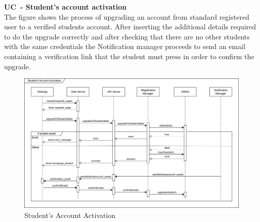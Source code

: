 \textbf{UC\cuc\  - Student’s account activation} \\
The figure shows the process of upgrading an account from standard registered user to a verified students account. After inserting the additional details required to do the upgrade correctly and after checking that there are no other students with the same credentials the Notification manager proceeds to send an email containing a verification link that the student must press in order to confirm the upgrade.
\begin{center}
    \begin{figure}[H]
        \centering
        \includegraphics[width=1\linewidth]{Images/Sequence diagrams/UC3.png}
        \caption{Student's Account Activation}
        \label{fig:enter-label}
    \end{figure}
\end{center}


